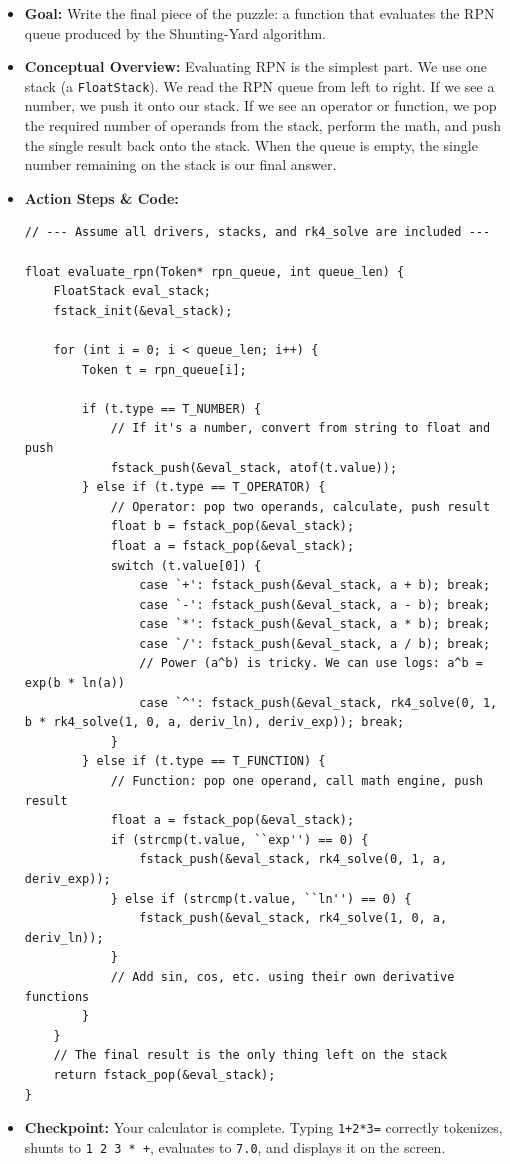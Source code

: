 \documentclass[11pt,a4paper]{article}
\begin{document}
\begin{itemize}
    \item \textbf{Goal:} Write the final piece of the puzzle: a function that evaluates the RPN queue produced by the Shunting-Yard algorithm.
    \item \textbf{Conceptual Overview:} Evaluating RPN is the simplest part. We use one stack (a \verb|FloatStack|). We read the RPN queue from left to right. If we see a number, we push it onto our stack. If we see an operator or function, we pop the required number of operands from the stack, perform the math, and push the single result back onto the stack. When the queue is empty, the single number remaining on the stack is our final answer.
    \item \textbf{Action Steps \& Code:}
\begin{lstlisting}[caption={Code for Module 10.2: The RPN Evaluator}]
// --- Assume all drivers, stacks, and rk4_solve are included ---

float evaluate_rpn(Token* rpn_queue, int queue_len) {
    FloatStack eval_stack;
    fstack_init(&eval_stack);

    for (int i = 0; i < queue_len; i++) {
        Token t = rpn_queue[i];

        if (t.type == T_NUMBER) {
            // If it's a number, convert from string to float and push
            fstack_push(&eval_stack, atof(t.value));
        } else if (t.type == T_OPERATOR) {
            // Operator: pop two operands, calculate, push result
            float b = fstack_pop(&eval_stack);
            float a = fstack_pop(&eval_stack);
            switch (t.value[0]) {
                case `+': fstack_push(&eval_stack, a + b); break;
                case `-': fstack_push(&eval_stack, a - b); break;
                case `*': fstack_push(&eval_stack, a * b); break;
                case `/': fstack_push(&eval_stack, a / b); break;
                // Power (a^b) is tricky. We can use logs: a^b = exp(b * ln(a))
                case `^': fstack_push(&eval_stack, rk4_solve(0, 1, b * rk4_solve(1, 0, a, deriv_ln), deriv_exp)); break;
            }
        } else if (t.type == T_FUNCTION) {
            // Function: pop one operand, call math engine, push result
            float a = fstack_pop(&eval_stack);
            if (strcmp(t.value, ``exp'') == 0) {
                fstack_push(&eval_stack, rk4_solve(0, 1, a, deriv_exp));
            } else if (strcmp(t.value, ``ln'') == 0) {
                fstack_push(&eval_stack, rk4_solve(1, 0, a, deriv_ln));
            }
            // Add sin, cos, etc. using their own derivative functions
        }
    }
    // The final result is the only thing left on the stack
    return fstack_pop(&eval_stack);
}
\end{lstlisting}
    \item \textbf{Checkpoint:} Your calculator is complete. Typing \verb|1+2*3=| correctly tokenizes, shunts to \verb|1 2 3 * +|, evaluates to \verb|7.0|, and displays it on the screen.
\end{itemize}
\newpage
\end{document}
